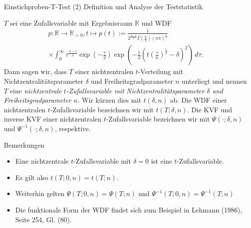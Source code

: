 \documentclass[
  8pt,
  ignorenonframetext,
]{beamer}
\providecommand{\tightlist}{%
  \setlength{\itemsep}{0pt}\setlength{\parskip}{0pt}}
\begin{document}
\begin{frame}{Einstichproben-T-Test \textbar{} (2) Definition und
Analyse der Teststatistik}
\protect\hypertarget{einstichproben-t-test-2-definition-und-analyse-der-teststatistik-1}{}
\footnotesize
\begin{definition}
\justifying
$T$ sei eine Zufallsvariable mit Ergebnisraum $\mathbb{R}$ und WDF
\begin{multline}
p : \mathbb{R} \to \mathbb{R}_{>0}, t \mapsto p(t) :=
\frac{1}{2^{\frac{n-1}{2}}\Gamma\left(\frac{n}{2} \right)(n \pi)^{\frac{1}{2}}} \\
\times \int_{0}^\infty \tau^{\frac{n-1}{2}} \exp\left(-\frac{\tau}{2}\right)
\exp\left(-\frac{1}{2}\left(t \left(\frac{\tau}{n}\right)^{\frac{1}{2}} - \delta \right)^2 \right)\,d\tau.
\end{multline}
Dann sagen wir, dass $T$ einer
nichtzentralen $t$-Verteilung mit Nichtzentralitätsparameter $\delta$ und
Freiheitsgradparameter $n$ unterliegt und nennen $T$ eine \textit{nichtzentrale
$t$-Zufallsvariable mit Nichtzentralitätsparameter $\delta$ und
Freiheitsgradparameter $n$}. Wir kürzen dies mit $t(\delta, n)$ ab. Die WDF einer
nichtzentralen $t$-Zufallsvariable bezeichnen wir mit
$t(T;\delta,n)$. Die KVF und inverse KVF einer nichtzentralen $t$-Zufallsvariable
bezeichnen wir mit $\Psi(\cdot; \delta, n)$ und $\Psi^{-1}(\cdot; \delta, n)$, respektive.
\end{definition}

Bemerkungen

\begin{itemize}
\tightlist
\item
  Eine nichtzentrale \(t\)-Zufallsvariable mit \(\delta = 0\) ist eine
  \(t\)-Zufallsvariable.
\item
  Es gilt also \(t(T;0,n) = t(T;n)\).
\item
  Weiterhin gelten \(\Psi(T;0,n) = \Psi(T;n)\) und
  \(\Psi^{-1}(T;0,n) = \Psi^{-1}(T;n)\)
\item
  Die funktionale Form der WDF findet sich zum Beispiel in Lehmann
  (1986), Seite 254, Gl. (80).
\end{itemize}
\end{frame}
\end{document}
